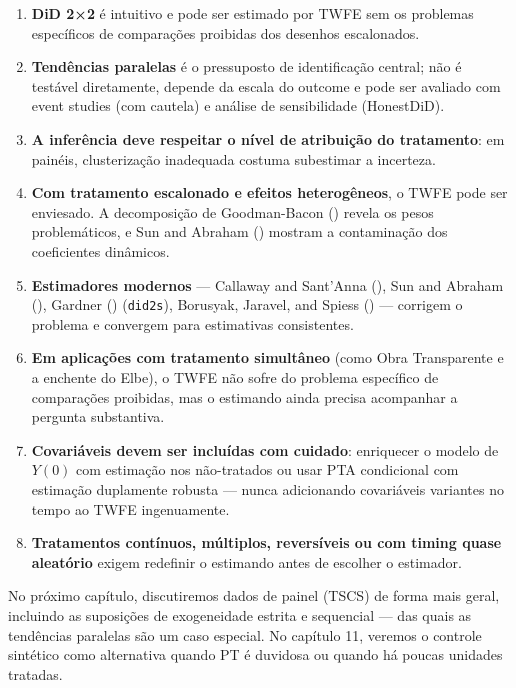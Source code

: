 \documentclass[
]{article}
\providecommand{\tightlist}{%
  \setlength{\itemsep}{0pt}\setlength{\parskip}{0pt}}
\begin{document}
\begin{enumerate}
\def\labelenumi{\arabic{enumi}.}
\tightlist
\item
  \textbf{DiD 2×2} é intuitivo e pode ser estimado por TWFE sem os problemas específicos de comparações proibidas dos desenhos escalonados.
\item
  \textbf{Tendências paralelas} é o pressuposto de identificação central; não é testável diretamente, depende da escala do outcome e pode ser avaliado com event studies (com cautela) e análise de sensibilidade (HonestDiD).
\item
  \textbf{A inferência deve respeitar o nível de atribuição do tratamento}: em painéis, clusterização inadequada costuma subestimar a incerteza.
\item
  \textbf{Com tratamento escalonado e efeitos heterogêneos}, o TWFE pode ser enviesado. A decomposição de Goodman-Bacon () revela os pesos problemáticos, e Sun and Abraham () mostram a contaminação dos coeficientes dinâmicos.
\item
  \textbf{Estimadores modernos} --- Callaway and Sant'Anna (), Sun and Abraham (), Gardner () (\texttt{did2s}), Borusyak, Jaravel, and Spiess () --- corrigem o problema e convergem para estimativas consistentes.
\item
  \textbf{Em aplicações com tratamento simultâneo} (como Obra Transparente e a enchente do Elbe), o TWFE não sofre do problema específico de comparações proibidas, mas o estimando ainda precisa acompanhar a pergunta substantiva.
\item
  \textbf{Covariáveis devem ser incluídas com cuidado}: enriquecer o modelo de \(Y(0)\) com estimação nos não-tratados ou usar PTA condicional com estimação duplamente robusta --- nunca adicionando covariáveis variantes no tempo ao TWFE ingenuamente.
\item
  \textbf{Tratamentos contínuos, múltiplos, reversíveis ou com timing quase aleatório} exigem redefinir o estimando antes de escolher o estimador.
\end{enumerate}

No próximo capítulo, discutiremos dados de painel (TSCS) de forma mais geral, incluindo as suposições de exogeneidade estrita e sequencial --- das quais as tendências paralelas são um caso especial. No capítulo 11, veremos o controle sintético como alternativa quando PT é duvidosa ou quando há poucas unidades tratadas.
\end{document}
